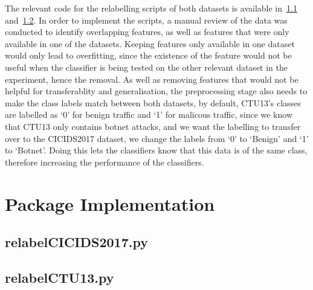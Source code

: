 The relevant code for the relabelling scripts of both datasets is available in~\ref{subsec:relabelCICIDS2017.py} and~\ref{subsec:relabelCTU13.py}. In order to implement the scripts, a manual review of the data was conducted to identify overlapping features, as well as features that were only available in one of the datasets. Keeping features only available in one dataset would only lead to overfitting, since the existence of the feature would not be useful when the classifier is being tested on the other relevant dataset in the experiment, hence the removal. As well as removing features that would not be helpful for transferablity and generalisation, the preprocessing stage also needs to make the class labels match between both datasets, by default, CTU13's classes are labelled as `0' for benign traffic and `1' for malicous traffic, since we know that CTU13 only contains botnet attacks, and we want the labelling to transfer over to the CICIDS2017 dataset, we change the labels from `0' to `Benign' and `1' to `Botnet'. Doing this lets the classifiers know that this data is of the same class, therefore increasing the performance of the classifiers.



\section{Package Implementation}\label{sec:package-implementation}

\subsection{relabelCICIDS2017.py}\label{subsec:relabelCICIDS2017.py}

\subsection{relabelCTU13.py}\label{subsec:relabelCTU13.py}